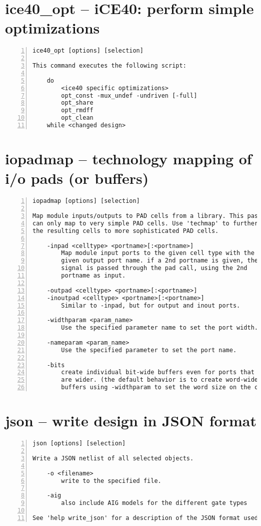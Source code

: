 \section{ice40\_opt -- iCE40: perform simple optimizations}
\label{cmd:ice40_opt}
\begin{lstlisting}[numbers=left,frame=single]
    ice40_opt [options] [selection]

This command executes the following script:

    do
        <ice40 specific optimizations>
        opt_const -mux_undef -undriven [-full]
        opt_share
        opt_rmdff
        opt_clean
    while <changed design>
\end{lstlisting}

\section{iopadmap -- technology mapping of i/o pads (or buffers)}
\label{cmd:iopadmap}
\begin{lstlisting}[numbers=left,frame=single]
    iopadmap [options] [selection]

Map module inputs/outputs to PAD cells from a library. This pass
can only map to very simple PAD cells. Use 'techmap' to further map
the resulting cells to more sophisticated PAD cells.

    -inpad <celltype> <portname>[:<portname>]
        Map module input ports to the given cell type with the
        given output port name. if a 2nd portname is given, the
        signal is passed through the pad call, using the 2nd
        portname as input.

    -outpad <celltype> <portname>[:<portname>]
    -inoutpad <celltype> <portname>[:<portname>]
        Similar to -inpad, but for output and inout ports.

    -widthparam <param_name>
        Use the specified parameter name to set the port width.

    -nameparam <param_name>
        Use the specified parameter to set the port name.

    -bits
        create individual bit-wide buffers even for ports that
        are wider. (the default behavior is to create word-wide
        buffers using -widthparam to set the word size on the cell.)
\end{lstlisting}

\section{json -- write design in JSON format}
\label{cmd:json}
\begin{lstlisting}[numbers=left,frame=single]
    json [options] [selection]

Write a JSON netlist of all selected objects.

    -o <filename>
        write to the specified file.

    -aig
        also include AIG models for the different gate types

See 'help write_json' for a description of the JSON format used.
\end{lstlisting}

